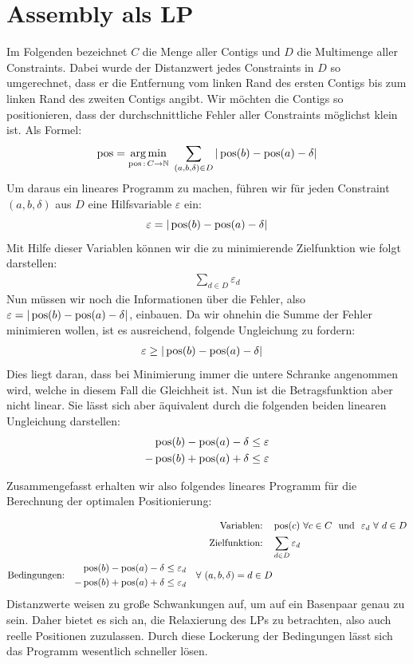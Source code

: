 \section{Assembly als LP} \raggedbottom 
Im Folgenden bezeichnet $C$ die Menge aller Contigs und $D$ die Multimenge aller Constraints. Dabei wurde der Distanzwert jedes Constraints in $D$ so umgerechnet, dass er die Entfernung 
vom linken Rand 
des ersten Contigs bis zum linken Rand des zweiten Contigs angibt.
Wir möchten die Contigs so positionieren, dass der durchschnittliche Fehler aller Constraints 
möglichst klein ist. Als Formel:
\[ \operatorname*{pos} = \operatorname*{arg\,min}_{\operatorname*{pos}\,:\, C \rightarrow \mathbb{N}} \ \sum_{(a,b,\delta) \in D} |\operatorname*{pos}(b) - \operatorname*{pos}(a) - \delta| \] 
Um daraus ein lineares Programm zu machen, führen wir für jeden Constraint $(a,b,\delta)$ aus $D$ eine Hilfsvariable $\varepsilon$ ein:
\[ \varepsilon = |\operatorname*{pos}(b) - \operatorname*{pos}(a) - \delta| \]
Mit Hilfe dieser Variablen können wir die zu minimierende Zielfunktion wie folgt darstellen:
\begin{align*}
\quad& \sum_{d \in D} \varepsilon_{d}
\end{align*}
Nun müssen wir noch die Informationen über die Fehler, also $\varepsilon = |\operatorname*{pos}(b) - \operatorname*{pos}(a) - \delta|$, einbauen. Da wir ohnehin die Summe der Fehler minimieren wollen, ist es ausreichend, folgende Ungleichung zu fordern:
\begin{align*}
\varepsilon \geq |\operatorname*{pos}(b) &- \operatorname*{pos}(a) - \delta|
\end{align*}
Dies liegt daran, dass bei Minimierung immer die untere Schranke angenommen wird, welche in diesem Fall die Gleichheit ist. Nun ist die Betragsfunktion aber nicht linear. Sie lässt sich aber äquivalent durch die folgenden beiden linearen Ungleichung darstellen:
\begin{align*}
\operatorname*{pos}(b) - \operatorname*{pos}(a) - \delta &\leq \varepsilon\\
-\operatorname*{pos}(b) + \operatorname*{pos}(a) + \delta &\leq \varepsilon
\end{align*}

Zusammengefasst erhalten wir also folgendes lineares Programm für die Berechnung der optimalen Positionierung:

\begin{align*}
\text{Variablen:}\quad& \pos(c) \ \forall c \in C \ \ \text{und} \ \ \varepsilon_{d} \ \forall \ d \in D\\
\text{Zielfunktion:}\quad& \sum_{d \in D} \varepsilon_{d}\\
\text{Bedingungen:}\quad \begin{split} \pos(b) - \pos(a) - \delta \leq \varepsilon_{d}\\
-\pos(b) + \pos(a) + \delta \leq \varepsilon_{d} \end{split}\quad \forall \ (a,b,\delta) = d \in D
\end{align*}
Distanzwerte weisen zu große Schwankungen auf, um auf ein Basenpaar genau zu sein. Daher bietet es sich an, die Relaxierung des LPs zu betrachten, also auch reelle Positionen zuzulassen. Durch diese Lockerung der Bedingungen lässt sich das Programm wesentlich schneller lösen.

